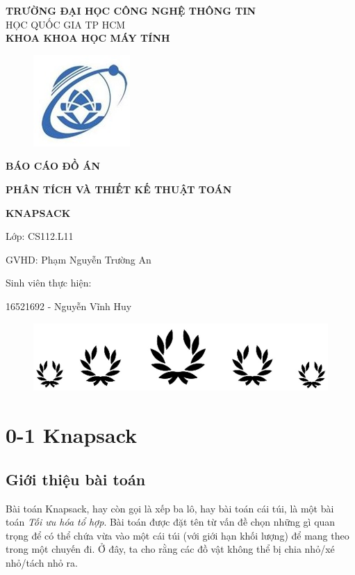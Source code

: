\documentclass[12pt,a4paper]{report}
\begin{document}
    \begin{center}
    \LARGE\textbf{TRƯỜNG ĐẠI HỌC CÔNG NGHỆ THÔNG TIN}\\
     HỌC QUỐC GIA TP HCM \\

    \LARGE\textbf{KHOA KHOA HỌC MÁY TÍNH}
        \begin{figure}[ht]
            \begin{center}
                \includegraphics[scale=1.0]{logo.jpg}\\
            \end{center}
        \end{figure}
    \LARGE\textbf{BÁO CÁO ĐỒ ÁN }

    \LARGE\textbf{PHÂN TÍCH VÀ THIẾT KẾ THUẬT TOÁN}
    
    \LARGE\textbf {KNAPSACK}

    Lớp: CS112.L11

    GVHD: Phạm Nguyễn Trường An

    Sinh viên thực hiện:

    16521692 - Nguyễn Vĩnh Huy
    \end{center}
    \begin{figure}[ht]
        \begin{center}
        \includegraphics[scale=1.0]{a.jpg}\\
        \end{center}
        \end{figure}
    \tableofcontents
    \chapter{0-1 Knapsack}
    \section{Giới thiệu bài toán}
    Bài toán Knapsack, hay còn gọi là xếp ba lô, hay bài toán cái túi,
    là một bài toán \textit{Tối ưu hóa tổ hợp}. Bài toán được đặt tên từ vấn đề
    chọn những gì quan trọng để có thể chứa vừa vào một cái túi (với giới hạn khối
    lượng) để mang theo trong một chuyến đi. Ở đây, ta cho rằng các đồ vật
    không thể bị chia nhỏ/xé nhỏ/tách nhỏ ra.
\end{document}
